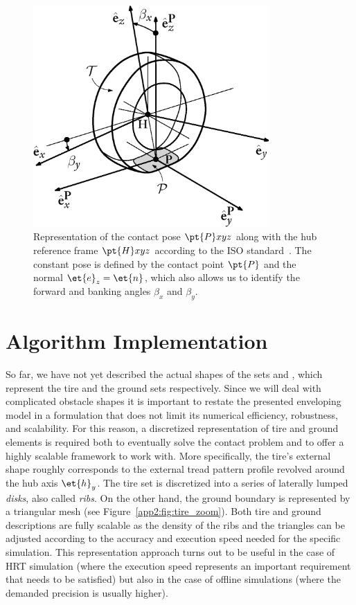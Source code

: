 \begin{figure}[htb]
  \centering
  \includegraphics[width=9cm]{./figures/appendix_2/tire_iso}
  \caption{Representation of the contact pose $\pt{P}xyz$ along with the hub reference frame $\pt{H}xyz$ according to the ISO standard~\cite{iso88552011}. The constant pose is defined by the contact point $\pt{P}$ and the normal $\et{e}_z = \et{n}$, which also allows us to identify the forward and banking angles $\beta_x$ and $\beta_y$.}
  \label{app2:fig:tire_iso}
\end{figure}


\section{Algorithm Implementation}
\label{app2:sec:algorithm_implementation}

So far, we have not yet described the actual shapes of the sets  and , which represent the tire and the ground sets respectively. Since we will deal with complicated obstacle shapes it is important to restate the presented enveloping model in a formulation that does not limit its numerical efficiency, robustness, and scalability. For this reason, a discretized representation of tire and ground elements is required both to eventually solve the contact problem and to offer a highly scalable framework to work with. More specifically, the tire's external shape roughly corresponds to the external tread pattern profile revolved around the hub axis $\et{h}_y$. The tire set is discretized into a series of laterally lumped \emph{disks}, also called \emph{ribs}. On the other hand, the ground boundary is represented by a triangular mesh (see Figure~\ref{app2:fig:tire_zoom}). Both tire and ground descriptions are fully scalable as the density of the ribs and the triangles can be adjusted according to the accuracy and execution speed needed for the specific simulation. This representation approach turns out to be useful in the case of \ac{HRT} simulation (where the execution speed represents an important requirement that needs to be satisfied) but also in the case of offline simulations (where the demanded precision is usually higher).

